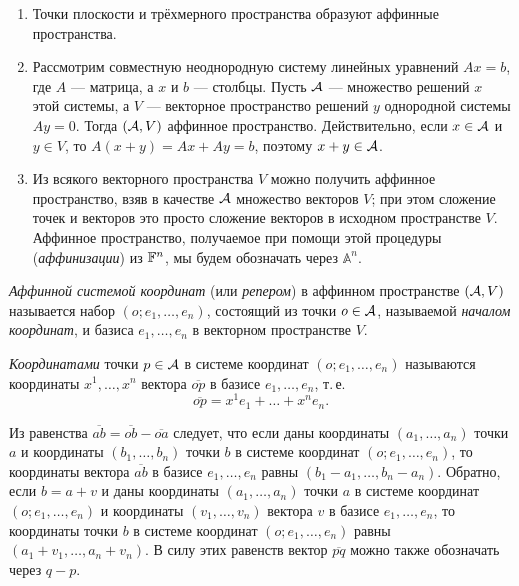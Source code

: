 \begin{remark}
    \begin{enumerate}[nolistsep]
        \item Точки плоскости и трёхмерного пространства образуют аффинные пространства.
        \item Рассмотрим совместную неоднородную систему линейных уравнений $Ax = b$, где $A$ --- матрица, а $x$ и $b$ --- столбцы. Пусть $\mathcal{A}$ --- множество решений $x$ этой системы, а $V$ --- векторное пространство решений $y$ однородной системы $Ay = 0$. Тогда $(\mathcal{A}, V)$ аффинное пространство. Действительно, если $x \in \mathcal{A}$ и $y \in V$, то $A(x + y) = Ax + Ay = b$, поэтому $x + y \in \mathcal{A}$.
        \item Из всякого векторного пространства $V$ можно получить аффинное пространство, взяв в качестве $\mathcal{A}$ множество векторов $V$; при этом сложение точек и векторов это просто сложение векторов в исходном пространстве $V$. Аффинное пространство, получаемое при помощи этой процедуры (\textit{аффинизации}) из $\mathbb{F}^n$, мы будем обозначать через $\mathbb{A}^n$.
    \end{enumerate}
\end{remark}

\begin{definition}
    \textit{Аффинной системой координат} (или \textit{репером}) в аффинном пространстве $(\mathcal{A}, V)$ называется набор $(o; e_1, \ldots, e_n)$, состоящий из точки $o \in \mathcal{A}$, называемой \textit{началом координат}, и базиса $e_1, \ldots, e_n$ в векторном пространстве $V$.

    \textit{Координатами} точки $p \in \mathcal{A}$ в системе координат $(o; e_1, \ldots, e_n)$ называются координаты $x^1, \ldots, x^n$ вектора $\overline{op}$ в базисе $e_1, \ldots, e_n$, т.\,е.
    \[
        \overline{op} = x^1e_1 + \ldots + x^ne_n.
    \]
\end{definition}

Из равенства $\overline{ab} = \overline{ob} - \overline{oa}$ следует, что если даны координаты $(a_1, \ldots, a_n)$ точки $a$ и координаты $(b_1, \ldots, b_n)$ точки $b$ в системе координат $(o; e_1, \ldots, e_n)$, то координаты вектора $\overline{ab}$ в базисе $e_1, \ldots, e_n$ равны $(b_1 - a_1, \ldots, b_n - a_n)$. Обратно, если $b = a + v$ и даны координаты $(a_1, \ldots, a_n)$ точки $a$ в системе координат $(o; e_1, \ldots, e_n)$ и координаты $(v_1, \ldots, v_n)$ вектора $v$ в базисе $e_1, \ldots, e_n$, то координаты точки $b$ в системе координат $(o; e_1, \ldots, e_n)$ равны $(a_1 + v_1, \ldots, a_n + v_n)$. В силу этих равенств вектор $\overline{pq}$ можно также обозначать через $q - p$.

